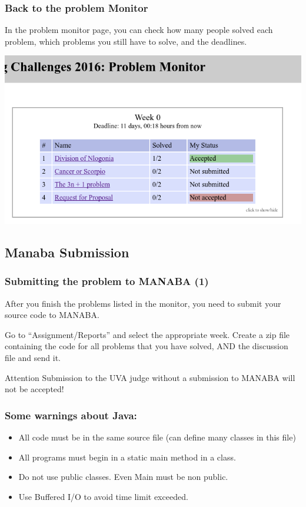 \documentclass{beamer}
\begin{document}
\begin{frame}
  \frametitle{Back to the problem Monitor}

  In the problem monitor page, you can check how many people solved
  each problem, which problems you still have to solve, and the
  deadlines.

  \begin{center}
    \includegraphics[width=.7\textwidth]{../img/monitorpage2}
  \end{center}
\end{frame}

\subsection{Manaba Submission}
\begin{frame}
  \frametitle{Submitting the problem to MANABA (1)}
  
  After you finish the problems listed in the monitor, you need to
  submit your source code to MANABA.

  Go to ``Assignment/Reports'' and select the appropriate week. Create
  a zip file containing the code for all problems that you have
  solved, AND the discussion file and send it.

  \begin{alertblock}{Attention}
  Submission to the UVA judge without a submission to MANABA will not
  be accepted!
  \end{alertblock}
\end{frame}

\begin{frame}
  \frametitle{Some warnings about Java:}

  \begin{itemize}
  \item All code must be in the same source file (can define many
    classes in this file)

    \medskip

  \item All programs must begin in a static main method in a
     class.

    \medskip

  \item Do not use public classes. Even Main must be non public.

    \medskip

  \item Use Buffered I/O to avoid time limit exceeded.
  \end{itemize}
\end{frame}
\end{document}

